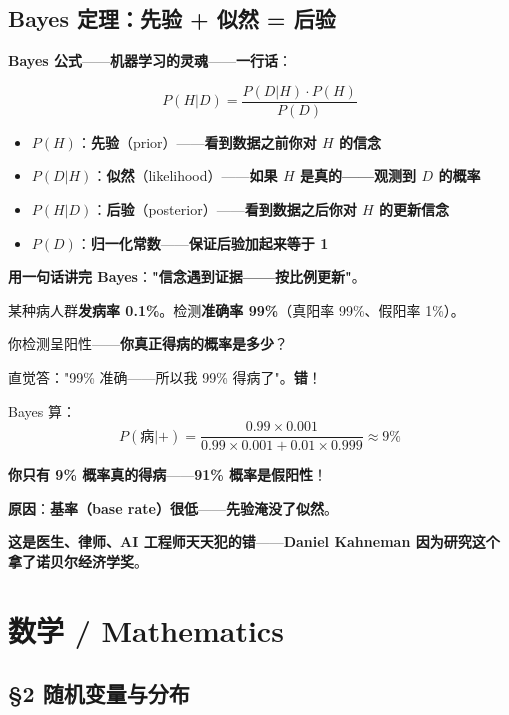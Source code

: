 \subsection{Bayes 定理：先验 + 似然 = 后验}

\textbf{Bayes 公式}——\textbf{机器学习的灵魂}——\textbf{一行话}：

\begin{equation}
\boxed{\,P(H|D) = \frac{P(D|H) \cdot P(H)}{P(D)}\,}
\end{equation}

\begin{itemize}
\item $P(H)$：\textbf{先验}（prior）——\textbf{看到数据之前你对 $H$ 的信念}
\item $P(D|H)$：\textbf{似然}（likelihood）——\textbf{如果 $H$ 是真的——观测到 $D$ 的概率}
\item $P(H|D)$：\textbf{后验}（posterior）——\textbf{看到数据之后你对 $H$ 的更新信念}
\item $P(D)$：\textbf{归一化常数}——\textbf{保证后验加起来等于 1}
\end{itemize}

\textbf{用一句话讲完 Bayes}：\textbf{"信念遇到证据——按比例更新"}。

\begin{example}
某种病人群\textbf{发病率 0.1\%}。检测\textbf{准确率 99\%}（真阳率 99\%、假阳率 1\%）。

你检测呈阳性——\textbf{你真正得病的概率是多少}？

直觉答："99\% 准确——所以我 99\% 得病了"。\textbf{错}！

Bayes 算：
\[
P(\text{病}|+) = \frac{0.99 \times 0.001}{0.99 \times 0.001 + 0.01 \times 0.999} \approx 9\%
\]

\textbf{你只有 9\% 概率真的得病}——\textbf{91\% 概率是假阳性}！

\textbf{原因}：\textbf{基率（base rate）很低}——\textbf{先验淹没了似然}。

\textbf{这是医生、律师、AI 工程师天天犯的错}——\textbf{Daniel Kahneman 因为研究这个拿了诺贝尔经济学奖}。
\end{example}

\section{数学 / Mathematics}

\subsection{§2 随机变量与分布}

